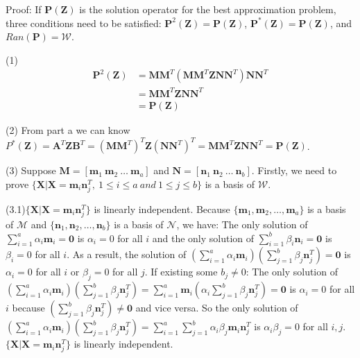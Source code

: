 \documentclass[22pt]{article}
\begin{document}
		Proof: If $\mathbf{P(Z)}$ is the solution operator for the best approximation problem, three conditions need to be satisfied: $\mathbf{P}^2(\mathbf{Z}) = \mathbf{P(Z)}$, $\mathbf{P^*(Z)} = \mathbf{P(Z)}$, and $Ran(\mathbf{P}) = \mathcal{W}$.

		(1) \begin{align}
			\mathbf{P}^2(\mathbf{Z}) & = \mathbf{MM}^T(\mathbf{MM}^T\mathbf{ZNN}^T)\mathbf{NN}^T\\
			& = \mathbf{MM}^T\mathbf{ZNN}^T\\
			& = \mathbf{P(Z)}
		\end{align}

		(2) From part a we can know $P^*(\mathbf{Z}) = \mathbf{A}^T\mathbf{Z}\mathbf{B}^T = (\mathbf{MM}^T)^T\mathbf{Z}(\mathbf{NN}^T)^T=\mathbf{MM}^T\mathbf{ZNN}^T = \mathbf{P(Z)} $.

		(3) Suppose $\mathbf{M} = [\mathbf{m}_1\ \mathbf{m}_2\ \dots\ \mathbf{m}_a]$ and $\mathbf{N} = [\mathbf{n}_1\ \mathbf{n}_2\ \dots\ \mathbf{n}_b]$. Firstly, we need to prove $\{\mathbf{X}|\mathbf{X} = \mathbf{m}_i\mathbf{n}_j^T,\ 1\leq i \leq a\ and\ 1\leq j\leq b \}$ is a basis of $\mathcal{W}$.

		\quad (3.1)$\{\mathbf{X}|\mathbf{X} = \mathbf{m}_i\mathbf{n}_j^T\}$ is linearly independent. Because $\{\mathbf{m}_1,\mathbf{m}_2,\dots,\mathbf{m}_a\}$ is a basis of $\mathcal{M}$ and $\{\mathbf{n}_1,\mathbf{n}_2,\dots,\mathbf{n}_b\}$ is a basis of $\mathcal{N}$, we have: The only solution of $\sum\limits_{i=1}^a \alpha_i\mathbf{m}_i = \mathbf{0}$ is $\alpha_i = 0$ for all $i$ and the only solution of $\sum\limits_{i=1}^b \beta_i\mathbf{n}_i = \mathbf{0}$ is $\beta_i = 0$ for all $i$. As a result, the solution of $(\sum\limits_{i=1}^a \alpha_i\mathbf{m}_i)(\sum\limits_{j=1}^b \beta_j\mathbf{n}_j^T) = \mathbf{0}$ is $\alpha_i = 0$ for all $i$ or $\beta_j = 0$ for all $j$. If existing some $b_j \not= 0$: The only solution of $(\sum\limits_{i=1}^a \alpha_i\mathbf{m}_i)(\sum\limits_{j=1}^b \beta_j\mathbf{n}_j^T) = \sum\limits_{i=1}^a \mathbf{m}_i(\alpha_i\sum\limits_{j=1}^b \beta_j\mathbf{n}_j^T) = \mathbf{0}$ is $\alpha_i=0$ for all $i$ because $(\sum\limits_{j=1}^b \beta_j\mathbf{n}_j^T) \not = \mathbf{0}$ and vice versa. So the only solution of $(\sum\limits_{i=1}^a \alpha_i\mathbf{m}_i)(\sum\limits_{j=1}^b \beta_j\mathbf{n}_j^T)  = \sum\limits_{i=1}^a\sum\limits_{j=1}^b \alpha_i \beta_j\mathbf{m}_i\mathbf{n}_j^T$ is $\alpha_i \beta_j = 0$ for all $i,j$. $\{\mathbf{X}|\mathbf{X} = \mathbf{m}_i\mathbf{n}_j^T\}$ is linearly independent.
\end{document}

